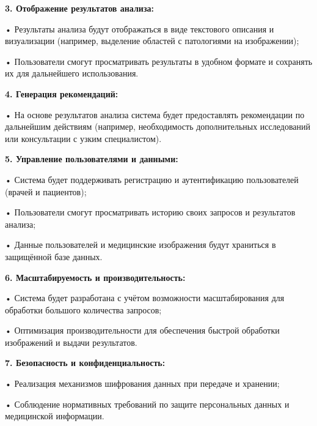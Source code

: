 {  \par \redline \textbf{3. Отображение результатов анализа:}
  \par \redline \hspace{0.3cm} • Результаты анализа будут отображаться в виде текстового описания и визуализации (например, выделение областей с патологиями на изображении);
  \par \redline \hspace{0.3cm} • Пользователи смогут просматривать результаты в удобном формате и сохранять их для дальнейшего использования.

  \par \redline \textbf{4. Генерация рекомендаций:}
  \par \redline \hspace{0.3cm} • На основе результатов анализа система будет предоставлять рекомендации по дальнейшим действиям (например, необходимость дополнительных исследований или консультации с узким специалистом).

  \par \redline \textbf{5. Управление пользователями и данными:}
  \par \redline \hspace{0.3cm} • Система будет поддерживать регистрацию и аутентификацию пользователей (врачей и пациентов);
  \par \redline \hspace{0.3cm} • Пользователи смогут просматривать историю своих запросов и результатов анализа;
  \par \redline \hspace{0.3cm} • Данные пользователей и медицинские изображения будут храниться в защищённой базе данных.

  \par \redline \textbf{6. Масштабируемость и производительность:}
  \par \redline \hspace{0.3cm} • Система будет разработана с учётом возможности масштабирования для обработки большого количества запросов;
  \par \redline \hspace{0.3cm} • Оптимизация производительности для обеспечения быстрой обработки изображений и выдачи результатов.

  \par \redline \textbf{7. Безопасность и конфиденциальность:}
  \par \redline \hspace{0.3cm} • Реализация механизмов шифрования данных при передаче и хранении;
  \par \redline \hspace{0.3cm} • Соблюдение нормативных требований по защите персональных данных и медицинской информации.

}
